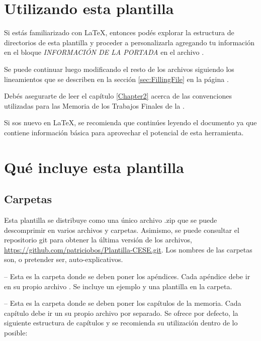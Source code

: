 
\section{Utilizando esta plantilla}

Si estás familiarizado con \LaTeX{}, entonces podés explorar la estructura de directorios de esta plantilla y proceder a personalizarla agregando tu información en el bloque \emph{INFORMACIÓN DE LA PORTADA} en el archivo .  

Se puede continuar luego modificando el resto de los archivos siguiendo los lineamientos que se describen en la sección \ref{sec:FillingFile} en la página \pageref{sec:FillingFile}.

Debés asegurarte de leer el capítulo \ref{Chapter2} acerca de las convenciones utilizadas para las Memoria de los Trabajos Finales de la \degreename.

Si sos nuevo en \LaTeX{}, se recomienda que continúes leyendo el documento ya que contiene información básica para aprovechar el potencial de esta herramienta.



\section{Qué incluye esta plantilla}

\subsection{Carpetas}

Esta plantilla se distribuye como una único archivo .zip que se puede descomprimir en varios archivos y carpetas. Asimismo, se puede consultar el repositorio git para obtener la última versión de los archivos, \url{https://github.com/patriciobos/Plantilla-CESE.git}. Los nombres de las carpetas son, o pretender ser, auto-explicativos.

 -- Esta es la carpeta donde se deben poner los apéndices. Cada apéndice debe ir en su propio archivo . Se incluye un ejemplo y una plantilla en la carpeta.

 -- Esta es la carpeta donde se deben poner los capítulos de la memoria. Cada capítulo debe ir un su propio archivo  por separado.  Se ofrece por defecto, la siguiente estructura de capítulos y se recomienda su utilización dentro de lo posible:

